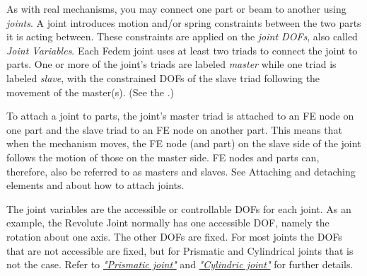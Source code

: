 %
%

%
%


As with real mechanisms, you may connect one part or beam to another using
{\sl joints}. A joint introduces motion and/or spring constraints between the
two parts it is acting between. These constraints are applied on the
{\sl joint DOFs}, also called {\sl Joint Variables}. Each Fedem joint uses
at least two triads to connect the joint to parts.
One or more of the joint's triads are labeled {\sl master} while one triad
is labeled {\sl slave}, with the constrained DOFs of the slave triad following
the movement of the master(s).
(See the .)

To attach a joint to parts, the joint's master triad is attached
to an FE node on one part and the slave triad to an FE node on another part.
This means that when the mechanism moves, the FE node (and part) on the slave
side of the joint follows the motion of those on the master side.
FE nodes and parts can, therefore, also be referred to as masters and slaves.
See 
{Attaching and detaching elements} and
about how to attach joints.




The joint variables are the accessible or controllable DOFs for each joint.
As an example, the Revolute Joint normally has one accessible DOF,
namely the rotation about one axis. The other DOFs are fixed.
For most joints the DOFs that are not accessible are fixed,
but for Prismatic and Cylindrical joints that is not the case.
Refer to \protect\hyperlink{prismatic-joint}{\sl"Prismatic joint"} and
\protect\hyperlink{cylindric-joint}{\sl"Cylindric joint"} for further details.

